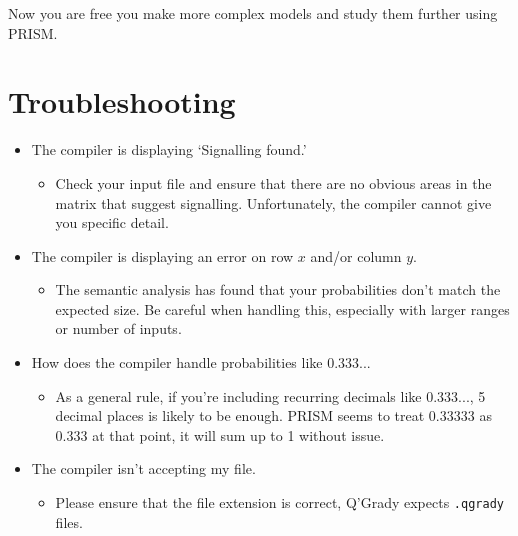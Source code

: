 \documentclass[report.tex]{subfiles}
\begin{document}
Now you are free you make more complex models and study them further using
PRISM.

\section{Troubleshooting} %
\label{sec:troubleshooting}
\begin{itemize}
    \item The compiler is displaying `Signalling found.'
    \begin{itemize}
        \item Check your input file and ensure that there are no obvious areas
        in the matrix that suggest signalling. Unfortunately, the compiler
        cannot give you specific detail.
    \end{itemize}
    \item The compiler is displaying an error on row \(x\) and/or column \(y\).
    \begin{itemize}
        \item The semantic analysis has found that your probabilities don't
        match the expected size. Be careful when handling this, especially with
        larger ranges or number of inputs.
    \end{itemize}
    \item How does the compiler handle probabilities like 0.333...
    \begin{itemize}
        \item As a general rule, if you're including recurring decimals like
        0.333..., 5 decimal places is likely to be enough. PRISM seems to treat
        0.33333 as 0.333 at that point, it will sum up to 1 without issue.
    \end{itemize}
    \item The compiler isn't accepting my file.
    \begin{itemize}
        \item Please ensure that the file extension is correct, Q'Grady expects
        \texttt{.qgrady} files.
    \end{itemize}
\end{itemize}

\newpage
\end{document}
